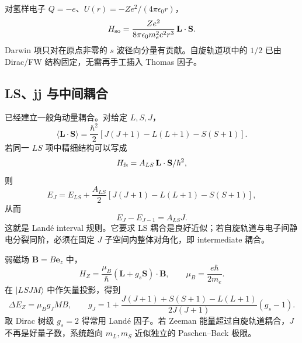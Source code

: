 对氢样电子 $Q=-e$、$U(r)=-Ze^2/(4\pi\epsilon_0r)$，
\[
H_{\rm so}
=\frac{Ze^2}{8\pi\epsilon_0m_e^2c^2r^3}\,\mathbf L\cdot\mathbf S.
\]
Darwin 项只对在原点非零的 $s$ 波径向分量有贡献。自旋轨道项中的 $1/2$ 已由 Dirac/FW 结构固定，无需再手工插入 Thomas 因子。

\subsection{LS、jj 与中间耦合}

已经建立一般角动量耦合。对给定 $L,S,J$，
\begin{equation}
\langle\mathbf L\cdot\mathbf S\rangle
=\frac{\hbar^2}{2}
[J(J+1)-L(L+1)-S(S+1)].
\label{eq:ls-expectation}
\end{equation}
若同一 $LS$ 项中精细结构可以写成
\[
H_{\rm fs}=A_{LS}\,\mathbf L\cdot\mathbf S/\hbar^2,
\]
则
\[
E_J
=E_{LS}+\frac{A_{LS}}{2}
[J(J+1)-L(L+1)-S(S+1)],
\]
从而
\begin{equation}
E_J-E_{J-1}=A_{LS}J.
\label{eq:lande-interval-energy}
\end{equation}
这就是 Land\'e interval 规则。它要求 LS 耦合是良好近似；若自旋轨道与电子间静电分裂同阶，必须在固定 $J$ 子空间内整体对角化，即 intermediate 耦合。

弱磁场 $\mathbf B=B\mathbf e_z$ 中，
\[
H_Z=\frac{\mu_B}{\hbar}(\mathbf L+g_s\mathbf S)\cdot\mathbf B,
\qquad
\mu_B=\frac{e\hbar}{2m_e}.
\]
在 $|LSJM\rangle$ 中作矢量投影，得到
\begin{equation}
\Delta E_Z=\mu_Bg_JMB,
\qquad
g_J
=1+\frac{J(J+1)+S(S+1)-L(L+1)}{2J(J+1)}(g_s-1).
\label{eq:lande-g-factor}
\end{equation}
取 Dirac 树级 $g_s=2$ 得常用 Land\'e 因子。若 Zeeman 能量超过自旋轨道耦合，$J$ 不再是好量子数，系统趋向 $m_L,m_S$ 近似独立的 Paschen--Back 极限。

